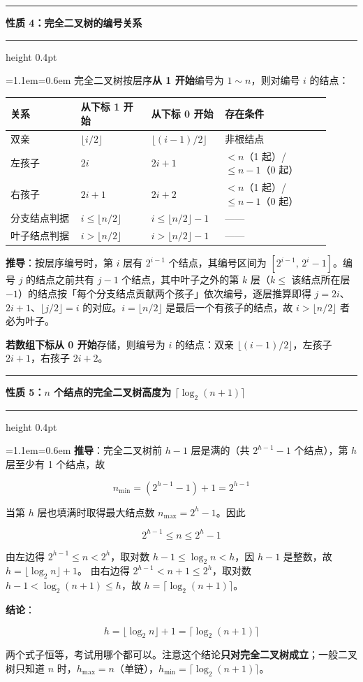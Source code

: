 \documentclass[11pt,openany,UTF8]{ctexbook}
\newcommand{\callouthead}[2]{%
  \par\addvspace{7pt}\noindent
  {\color{#1}\rule[-0.15em]{3pt}{1.05em}}\hspace{0.5em}%
  {\bfseries\color{#1}#2}\par\nobreak\vspace{-0.35em}%
  {\color{rulesep}\hrule height 0.4pt}\nobreak\vspace{0.45em}%
  \begingroup\small\setlength{\parindent}{0pt}%
  \leftskip=1.1em\rightskip=0.6em\noindent\ignorespaces}
\newcommand{\calloutend}{\par\endgroup\addvspace{7pt}}
\newenvironment{callkey}[1]{\callouthead{keybar}{#1}}{\calloutend}
\begin{document}
\begin{callkey}{性质 4：完全二叉树的编号关系}
完全二叉树按层序\textbf{从 1 开始}编号为 $1\sim n$，则对编号 $i$ 的结点：

\begingroup\small\setlength{\tabcolsep}{4.0pt}
\begin{longtable}{@{}L{0.2025\linewidth}L{0.2025\linewidth}L{0.2025\linewidth}L{0.3038\linewidth}@{}}
\toprule
\textbf{关系} & \textbf{从下标 1 开始} & \textbf{从下标 0 开始} & \textbf{存在条件} \\
\midrule
\endhead
双亲 & $\lfloor i/2\rfloor$ & $\lfloor (i-1)/2\rfloor$ & 非根结点 \\
左孩子 & $2i$ & $2i+1$ & $<n$（1 起）/ $\le n-1$（0 起） \\
右孩子 & $2i+1$ & $2i+2$ & $<n$（1 起）/ $\le n-1$（0 起） \\
分支结点判据 & $i\le\lfloor n/2\rfloor$ & $i\le\lfloor n/2\rfloor-1$ & —— \\
叶子结点判据 & $i>\lfloor n/2\rfloor$ & $i>\lfloor n/2\rfloor-1$ & —— \\
\bottomrule
\end{longtable}
\endgroup

\textbf{推导}：按层序编号时，第 $i$ 层有 $2^{i-1}$ 个结点，其编号区间为 $[2^{i-1},\,2^i-1]$。编号 $j$ 的结点之前共有 $j-1$ 个结点，其中叶子之外的第 $k$ 层（$k\le$ 该结点所在层 $-1$）的结点按「每个分支结点贡献两个孩子」依次编号，逐层推算即得 $j=2i$、$2i+1$、$\lfloor j/2\rfloor=i$ 的对应。$i=\lfloor n/2\rfloor$ 是最后一个有孩子的结点，故 $i>\lfloor n/2\rfloor$ 者必为叶子。

\textbf{若数组下标从 0 开始}存储，则编号为 $i$ 的结点：双亲 $\lfloor(i-1)/2\rfloor$，左孩子 $2i+1$，右孩子 $2i+2$。

\end{callkey}

\begin{callkey}{性质 5：$n$ 个结点的完全二叉树高度为 $\lceil\log_2(n+1)\rceil$}
\textbf{推导}：完全二叉树前 $h-1$ 层是满的（共 $2^{h-1}-1$ 个结点），第 $h$ 层至少有 1 个结点，故

\[n_{\min}=(2^{h-1}-1)+1=2^{h-1}\]

当第 $h$ 层也填满时取得最大结点数 $n_{\max}=2^h-1$。因此

\[2^{h-1}\le n\le 2^h-1\]

由左边得 $2^{h-1}\le n<2^h$，取对数 $h-1\le\log_2 n<h$，因 $h-1$ 是整数，故 $h=\lfloor\log_2 n\rfloor+1$。 由右边得 $2^{h-1}<n+1\le 2^h$，取对数 $h-1<\log_2(n+1)\le h$，故 $h=\lceil\log_2(n+1)\rceil$。

\textbf{结论}：

\[h=\lfloor\log_2 n\rfloor+1=\lceil\log_2(n+1)\rceil\]

两个式子恒等，考试用哪个都可以。注意这个结论\textbf{只对完全二叉树成立}；一般二叉树只知道 $n$ 时，$h_{\max}=n$（单链），$h_{\min}=\lceil\log_2(n+1)\rceil$。

\end{callkey}
\end{document}

